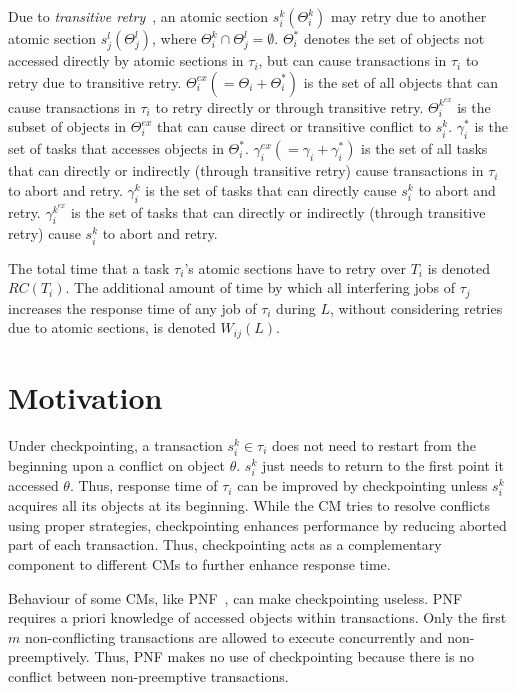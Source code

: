 \documentclass[preprint]{sigplanconf}
\begin{document}
Due to \textit{transitive retry}~\cite{pnf_dac_asp,fblt}, an atomic section $s_i^k(\Theta_i^k)$ may retry due to another atomic section $s_j^l(\Theta_j^l)$, where $\Theta_i^k \cap \Theta_j^l = \emptyset$. $\Theta_i^*$ denotes the set of objects not accessed directly by atomic sections in $\tau_i$, but can cause transactions in $\tau_i$ to retry due to transitive retry. $\Theta_i^{ex}(=\Theta_i + \Theta_i^*)$ is the set of all objects that can cause transactions in $\tau_i$ to retry directly or through transitive retry. $\Theta_i^{k^{ex}}$ is the subset of objects in $\Theta_i^{ex}$ that can cause direct or transitive conflict to $s_i^k$. $\gamma_i^*$ is the set of tasks that accesses  objects in $\Theta_i^*$. $\gamma_i^{ex}(=\gamma_i + \gamma_i^*)$ is the set of all tasks that can directly or indirectly (through transitive retry) cause transactions in $\tau_i$ to abort and retry. $\gamma_i^k$ is the set of tasks that can directly cause $s_i^k$ to abort and retry. $\gamma_i^{k^{ex}}$ is the set of tasks that can directly or indirectly (through transitive retry) cause $s_i^k$ to abort and retry.

The total time that a task $\tau_i$'s atomic sections have to retry over $T_i$ is denoted $RC(T_i)$. The additional amount of time by which all interfering jobs of $\tau_j$ increases the response time of any job of $\tau_i$ during $L$, without considering retries due to atomic sections, is denoted $W_{ij}(L)$.

\section{Motivation}\label{sec:motivation}

Under checkpointing, a transaction $s_i^k \in \tau_i$ does not need to restart from the beginning upon a conflict on object $\theta$. $s_i^k$ just needs to return to the first point it accessed $\theta$. Thus, response time of $\tau_i$ can be improved by checkpointing unless $s_i^k$ acquires all its objects at its beginning. While the CM tries to resolve conflicts using proper strategies, checkpointing enhances performance by reducing aborted part of each transaction. Thus, checkpointing acts as a complementary component to different CMs to further enhance response time.

Behaviour of some CMs, like PNF~\cite{pnf_dac_asp}, can make checkpointing useless. PNF requires a priori knowledge of accessed objects within transactions. Only the first $m$ non-conflicting transactions are allowed to execute concurrently and non-preemptively. Thus, PNF makes no use of checkpointing because there is no conflict between non-preemptive transactions.
\end{document}
